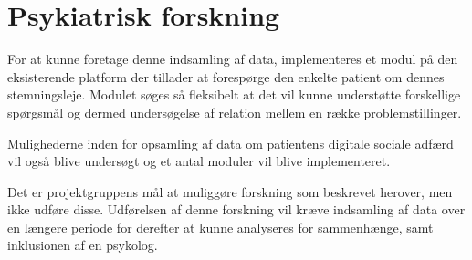 \chapter{Psykiatrisk forskning}\label{problem}
For at kunne foretage denne indsamling af data, implementeres et modul på den eksisterende platform \citefaelles{} der tillader at forespørge den enkelte patient om dennes stemningsleje.
Modulet søges så fleksibelt at det vil kunne understøtte forskellige spørgsmål og dermed undersøgelse af relation mellem en række problemstillinger.

Mulighederne inden for opsamling af data om patientens digitale sociale adfærd vil også blive undersøgt og et antal moduler vil blive implementeret.

Det er projektgruppens mål at muliggøre forskning som beskrevet herover, men ikke udføre disse.
Udførelsen af denne forskning vil kræve indsamling af data over en længere periode for derefter at kunne analyseres for sammenhænge, samt inklusionen af en psykolog.
